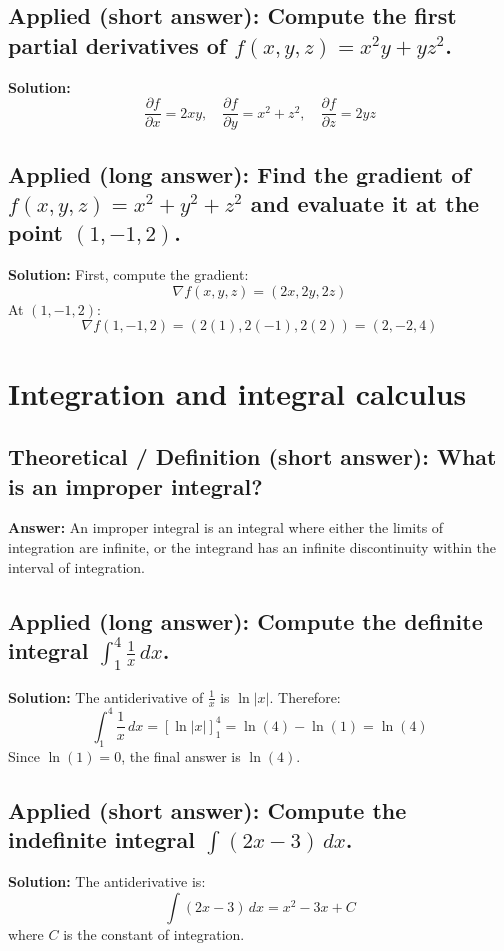 \documentclass[12pt]{article}
\begin{document}
\subsection{Applied (short answer): Compute the first partial derivatives of \( f(x, y, z) = x^2y + yz^2 \).}
\textbf{Solution:}
\[
\frac{\partial f}{\partial x} = 2xy, \quad \frac{\partial f}{\partial y} = x^2 + z^2, \quad \frac{\partial f}{\partial z} = 2yz
\]

\subsection{Applied (long answer): Find the gradient of \( f(x, y, z) = x^2 + y^2 + z^2 \) and evaluate it at the point \( (1, -1, 2) \).}
\textbf{Solution:}
First, compute the gradient:
\[
\nabla f(x, y, z) = (2x, 2y, 2z)
\]
At \( (1, -1, 2) \):
\[
\nabla f(1, -1, 2) = (2(1), 2(-1), 2(2)) = (2, -2, 4)
\]



\section{Integration and integral calculus}


\subsection{Theoretical / Definition (short answer): What is an improper integral?}
\textbf{Answer:} An improper integral is an integral where either the limits of integration are infinite, or the integrand has an infinite discontinuity within the interval of integration.



\subsection{Applied (long answer): Compute the definite integral \( \int_1^4 \frac{1}{x} \, dx \).}
\textbf{Solution:}
The antiderivative of \( \frac{1}{x} \) is \( \ln|x| \). Therefore:
\[
\int_1^4 \frac{1}{x} \, dx = \left[ \ln|x| \right]_1^4 = \ln(4) - \ln(1) = \ln(4)
\]
Since \( \ln(1) = 0 \), the final answer is \( \ln(4) \).

\subsection{Applied (short answer): Compute the indefinite integral \( \int (2x - 3) \, dx \).}
\textbf{Solution:}
The antiderivative is:
\[
\int (2x - 3) \, dx = x^2 - 3x + C
\]
where \( C \) is the constant of integration.
\end{document}
